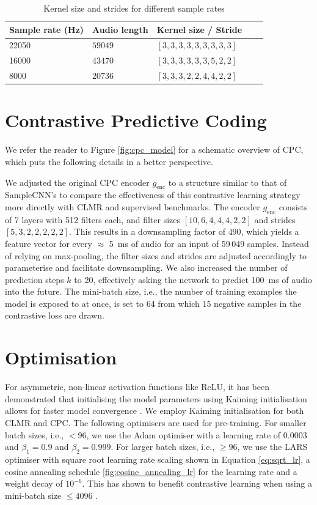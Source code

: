 \begin{table}
    \centering
        \begin{tabular}{lllll}\toprule
        Sample rate (Hz) & Audio length & Kernel size / Stride & \\\midrule
        22050 & $59049$  & $[3, 3, 3, 3, 3, 3, 3, 3, 3]$ \\
        16000 & $43470$ & $[3, 3, 3, 3, 3, 3, 5, 2, 2]$ \\
        8000 & $20736$ & $[3, 3, 3, 2, 2, 4, 4, 2, 2]$ \\                       
        \bottomrule
        \end{tabular}
    \caption{Kernel size and strides for different sample rates}
    \label{tab:samplecnn_config}
\end{table}

\section{Contrastive Predictive Coding}
We refer the reader to Figure \ref{fig:cpc_model} for a schematic overview of CPC, which puts the following details in a better perspective.

We adjusted the original CPC encoder $g_{\mathrm{enc}}$ to a structure similar to that of SampleCNN's to compare the effectiveness of this contrastive learning strategy more directly with CLMR and supervised benchmarks.
The encoder $g_{\mathrm{enc}}$ consists of 7 layers with 512 filters each, and filter sizes $[10, 6, 4, 4, 4, 2, 2]$ and strides $[5, 3, 2, 2, 2, 2, 2]$.
This results in a downsampling factor of $490$, which yields a feature vector for every $\approx$ 5~ms of audio for an input of 59\,049 samples.
Instead of relying on max-pooling, the filter sizes and strides are adjusted accordingly to parameterise and facilitate downsampling.
We also increased the number of prediction steps $k$ to 20, effectively asking the network to predict 100~ms of audio into the future.
The mini-batch size, i.e., the number of training examples the model is exposed to at once, is set to 64 from which 15 negative samples in the contrastive loss are drawn.

\section{Optimisation}
For asymmetric, non-linear activation functions like ReLU, it has been demonstrated that initialising the model parameters using Kaiming initialisation allows for faster model convergence \cite{he2015delving}.
We employ Kaiming initialisation for both CLMR and CPC. The following optimisers are used for pre-training. For smaller batch sizes, i.e., $< 96$, we use the Adam optimiser with a learning rate of $0.0003$ and $\beta_1 = 0.9$ and $\beta_2 = 0.999$. 
For larger batch sizes, i.e., $\geq 96$, we use the LARS optimiser with  square root learning rate scaling shown in Equation \ref{eq:sqrt_lr}, a cosine annealing schedule \ref{fig:cosine_annealing_lr} for the learning rate and a weight decay of $10^{-6}$.
This has shown to benefit contrastive learning when using a mini-batch size $\leq 4096$ \cite{chen_simple_2020}.


